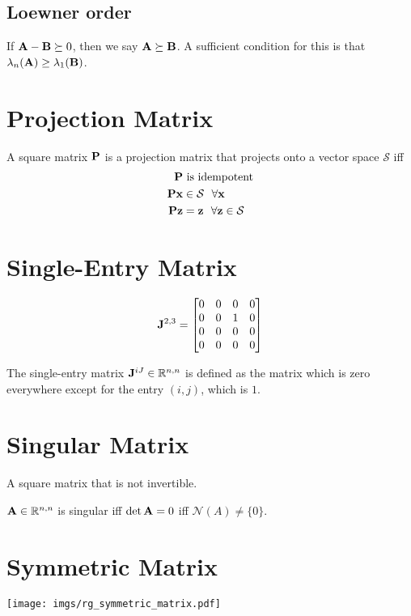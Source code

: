 \subsection{Loewner order}
If $\mathbf{A}-\mathbf{B}\succeq 0$, then we say $\mathbf{A}\succeq \mathbf{B}$. A sufficient condition for this is that $\lambda_n(\mathbf{A})\ge\lambda_1(\mathbf{B})$.



\section{Projection Matrix}
A square matrix $\mathbf{P}$ is a projection matrix that projects onto a vector space $\mathcal{S}$ iff
\begin{align}
\mathbf{P}&~\textrm{is idempotent} \\
\mathbf{P}\mathbf{x}&\in\mathcal{S}~~\forall\mathbf{x} \\
\mathbf{P}\mathbf{z}&=\mathbf{z}~~\forall\mathbf{z}\in\mathcal{S}
\end{align}


\section{Single-Entry Matrix}
\label{sec:rogue_single_entry} 
\begin{equation}
\mathbf{J}^{2,3} =
\begin{bmatrix}
0 & 0 & 0 & 0 \\
0 & 0 & 1 & 0 \\
0 & 0 & 0 & 0 \\
0 & 0 & 0 & 0
\end{bmatrix}
\end{equation}

The single-entry matrix $\mathbf{J}^{iJ}\in\mathbb{R}^{n,n}$ is defined as the matrix which is zero everywhere except for the entry $(i,j)$, which is $1$.





\section{Singular Matrix}
A square matrix that is not invertible.

$\mathbf{A}\in\mathbb{R}^{n,n}$ is singular iff $\det \mathbf{A}=0$ iff $\mathcal{N}(A)\ne\{0\}$.


\section{Symmetric Matrix}

\begin{center}
\texttt{[image: imgs/rg\_symmetric\_matrix.pdf]}
\end{center}

